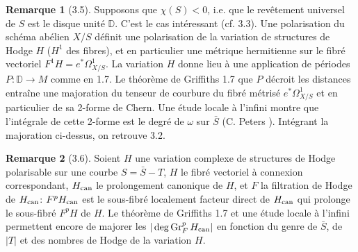 \documentclass[12pt,a4paper]{article}
\theoremstyle{plain}
\theoremstyle{definition}
\newtheorem{remark}{Remarque}[section]
\DeclareMathOperator{\Gr}{Gr}
\newcommand{\can}{\textup{can}}
\begin{document}
\begin{remark}[3.5]
Supposons que $\chi(S) < 0$, i.e. que le rev\^{e}tement universel de $S$ est le disque unit\'{e} $\mathbb{D}$. C'est le cas int\'{e}ressant (cf. 3.3). Une polarisation du sch\'{e}ma ab\'{e}lien $X/S$ d\'{e}finit une polarisation de la variation de structures de Hodge $H$ ($H^{1}$ des fibres), et en particulier une m\'{e}trique hermitienne sur le fibr\'{e} vectoriel $F^{1}H = e^{*}\Omega^{1}_{X/S}$. La variation $H$ donne lieu \`{a} une application de p\'{e}riodes $P : \mathbb{D} \to M$ comme en 1.7. Le th\'{e}or\`{e}me de Griffiths 1.7 que $P$ d\'{e}croit les distances entra\^{i}ne une majoration du tenseur de courbure du fibr\'{e} m\'{e}tris\'{e} $e^{*}\Omega^{1}_{X/S}$ et en particulier de sa 2-forme de Chern. Une \'{e}tude locale \`{a} l'infini montre que l'int\'{e}grale de cette 2-forme est le degr\'{e} de $\omega$ sur $\bar{S}$ (C. Peters \cite{Peters}). Int\'{e}grant la majoration ci-dessus, on retrouve 3.2.
\end{remark}

\begin{remark}[3.6]
Soient $H$ une variation complexe de structures de Hodge polarisable sur une courbe $S = \bar{S} - T$, $H$ le fibr\'{e} vectoriel \`{a} connexion correspondant, $H_{\can}$ le prolongement canonique de $H$, et $F$ la filtration de Hodge de $H_{\can}$: $F^{p}H_{\can}$ est le sous-fibr\'{e} localement facteur direct de $H_{\can}$ qui prolonge le sous-fibr\'{e} $F^{p}H$ de $H$. Le th\'{e}or\`{e}me de Griffiths 1.7 et une \'{e}tude locale \`{a} l'infini \cite{Zucker} permettent encore de majorer les $|\deg \Gr_{F}^{p}H_{\can}|$ en fonction du genre de $\bar{S}$, de $|T|$ et des nombres de Hodge de la variation $H$.
\end{remark}
\end{document}
